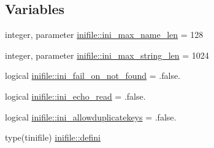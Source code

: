 \subsection*{Variables}
\begin{DoxyCompactItemize}
\item 
integer, parameter \mbox{\hyperlink{namespaceinifile_aca6c65c541b90a27fa1d196098820185}{inifile\+::ini\+\_\+max\+\_\+name\+\_\+len}} = 128
\item 
integer, parameter \mbox{\hyperlink{namespaceinifile_a32faebf83b580d14b5af965dcb4eebfd}{inifile\+::ini\+\_\+max\+\_\+string\+\_\+len}} = 1024
\item 
logical \mbox{\hyperlink{namespaceinifile_af2ea5b648018a1448db850e370de1486}{inifile\+::ini\+\_\+fail\+\_\+on\+\_\+not\+\_\+found}} = .false.
\item 
logical \mbox{\hyperlink{namespaceinifile_a411a55fcdbda40f4d2023d7a887adf60}{inifile\+::ini\+\_\+echo\+\_\+read}} = .false.
\item 
logical \mbox{\hyperlink{namespaceinifile_a52182dda791468397009e779cd19eb94}{inifile\+::ini\+\_\+allowduplicatekeys}} = .false.
\item 
type(tinifile) \mbox{\hyperlink{namespaceinifile_aba287d83fd6e9c158ca1906470148d9d}{inifile\+::defini}}
\end{DoxyCompactItemize}

